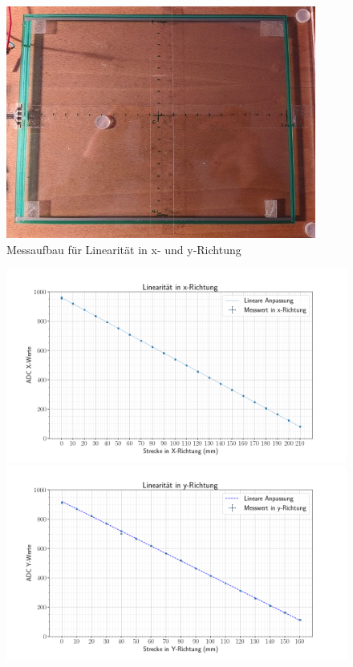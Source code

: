 \begin{figure}[ht!]
    \centering
    \includegraphics[width=0.6\linewidth]{fig/messlinear.jpg}
    \caption{Messaufbau für Linearität in x- und y-Richtung}
    \label{fig:messlinear}
\end{figure}

\begin{figure}[ht!]
    \centering
    \includegraphics[width=\linewidth]{fig/8_linearitaet_x.png}
    \caption{}
    \label{fig:xlinear}
    \includegraphics[width=\linewidth]{fig/8_linearitaet_y.png}
    \caption{}
    \label{fig:ylinear}
\end{figure}
